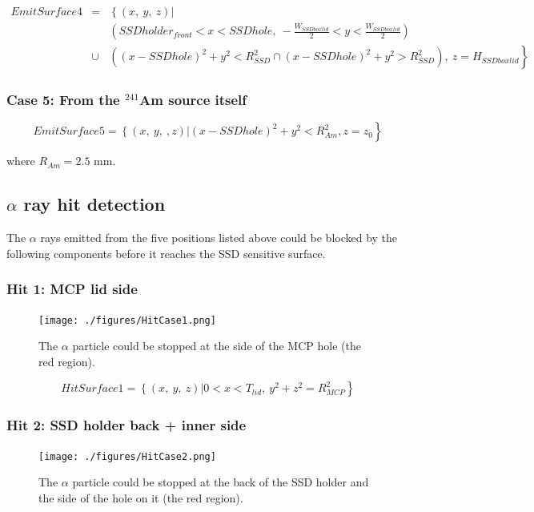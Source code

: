 \documentclass{article}
\begin{document}
\begin{eqnarray*}
	EmitSurface4 & = & \left\{ (x,~y,~z) \right| \\
	&  & \left( SSDholder_{front} < x < SSDhole,~-\frac{W_{SSDboxlid}}{2} < y < \frac{W_{SSDboxlid}}{2} \right) \\
	& \cup & \left. \left( (x-SSDhole)^2+y^2 < R_{SSD}^2 \cap (x-SSDhole)^2+y^2 > R_{SSD}^2 \right),~z = H_{SSDboxlid} \right\}
\end{eqnarray*}


\subsubsection{Case 5: From the ${}^{241}$Am source itself}

$$
EmitSurface5 = \left\{(x,~y,~,z) \right| \left. (x-SSDhole)^2 + y^2 < R_{Am}^2, z = z_0 \right\}
$$

where $R_{Am} = 2.5$ mm.



\subsection{$\alpha$ ray hit detection}

The $\alpha$ rays emitted from the five positions listed above could be blocked by the following components before it reaches the SSD sensitive surface. 


\subsubsection{Hit 1: MCP lid side}

\begin{figure}[H]
  \begin{center}
    \texttt{[image: ./figures/HitCase1.png]}
	  \caption{The $\alpha$ particle could be stopped at the side of the MCP hole (the red region).}
    \label{fig:HitCase1}
  \end{center}
\end{figure}

$$
HitSurface1 = \left\{(x,~y,~z) \right| \left. 0 < x < T_{lid},~ y^2+z^2 = R_{MCP}^2 \right\}
$$

\subsubsection{Hit 2: SSD holder back + inner side}

\begin{figure}[H]
  \begin{center}
    \texttt{[image: ./figures/HitCase2.png]}
	  \caption{The $\alpha$ particle could be stopped at the back of the SSD holder and the side of the hole on it (the red region).}
    \label{fig:HitCase2}
  \end{center}
\end{figure}
\end{document}
